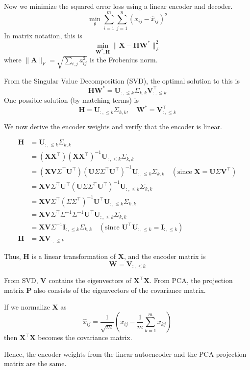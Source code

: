 Now we minimize the squared error loss using a linear encoder and decoder. 
\[
\min_{\theta} \sum_{i=1}^{m} \sum_{j=1}^{n} (x_{ij} - \hat{x}_{ij})^2
\]
In matrix notation, this is 
\[
\min_{\mathbf{W}^*, \mathbf{H}} \| \mathbf{X} - \mathbf{H} \mathbf{W}^* \|_F^2
\]
where \( \| \mathbf{A} \|_F = \sqrt{\sum_{i,j} a_{ij}^2} \) is the Frobenius norm.

From the Singular Value Decomposition (SVD), the optimal solution to this is 
\[
\mathbf{H} \mathbf{W}^* = \mathbf{U}_{:, \leq k} \Sigma_{k,k} \mathbf{V}_{:, \leq k}^\top
\]
One possible solution (by matching terms) is 
\[
\mathbf{H} = \mathbf{U}_{:, \leq k} \Sigma_{k,k}, \quad \mathbf{W}^* = \mathbf{V}_{:, \leq k}^\top
\]

We now derive the encoder weights and verify that the encoder is linear.

\begin{align*}
\mathbf{H} &= \mathbf{U}_{:, \leq k} \Sigma_{k,k} \\
&= (\mathbf{X} \mathbf{X}^\top)(\mathbf{X} \mathbf{X}^\top)^{-1} \mathbf{U}_{:, \leq k} \Sigma_{k,k} \\
&= (\mathbf{X} \mathbf{V} \Sigma^\top \mathbf{U}^\top)(\mathbf{U} \Sigma \Sigma^\top \mathbf{U}^\top)^{-1} \mathbf{U}_{:, \leq k} \Sigma_{k,k} \quad (\text{since } \mathbf{X} = \mathbf{U} \Sigma \mathbf{V}^\top) \\
&= \mathbf{X} \mathbf{V} \Sigma^\top \mathbf{U}^\top (\mathbf{U} \Sigma \Sigma^\top \mathbf{U}^\top)^{-1} \mathbf{U}_{:, \leq k} \Sigma_{k,k} \\
&= \mathbf{X} \mathbf{V} \Sigma^\top (\Sigma \Sigma^\top)^{-1} \mathbf{U}^\top \mathbf{U}_{:, \leq k} \Sigma_{k,k} \\
&= \mathbf{X} \mathbf{V} \Sigma^\top \Sigma^{-1} \Sigma^{-1} \mathbf{U}^\top \mathbf{U}_{:, \leq k} \Sigma_{k,k} \\
&= \mathbf{X} \mathbf{V} \Sigma^{-1} \mathbf{I}_{:, \leq k} \Sigma_{k,k} \quad (\text{since } \mathbf{U}^\top \mathbf{U}_{:, \leq k} = \mathbf{I}_{:, \leq k}) \\
\mathbf{H} &= \mathbf{X} \mathbf{V}_{:, \leq k}
\end{align*}

Thus, \( \mathbf{H} \) is a linear transformation of \( \mathbf{X} \), and the encoder matrix is
\[
\mathbf{W} = \mathbf{V}_{:, \leq k}
\]

From SVD, \( \mathbf{V} \) contains the eigenvectors of \( \mathbf{X}^\top \mathbf{X} \). From PCA, the projection matrix \( \mathbf{P} \) also consists of the eigenvectors of the covariance matrix.

If we normalize \( \mathbf{X} \) as
\[
\hat{x}_{ij} = \frac{1}{\sqrt{m}} \left( x_{ij} - \frac{1}{m} \sum_{k=1}^{m} x_{kj} \right)
\]
then \( \mathbf{X}^\top \mathbf{X} \) becomes the covariance matrix.

Hence, the encoder weights from the linear autoencoder and the PCA projection matrix are the same.


